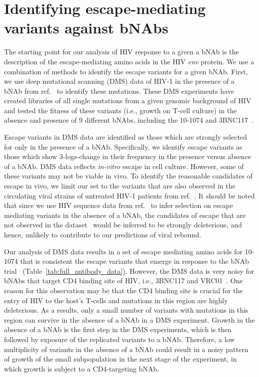 \documentclass[11pt]{article}
\begin{document}
\section{Identifying escape-mediating variants against bNAbs}
The starting point for our analysis of HIV response to a given a bNAb  is the description of the escape-mediating amino acids in the HIV {\em env} protein. We use a combination of methods to identify the escape variants for a given bNAb. First, we use deep mutational scanning (DMS) data  of HIV-1 in the presence of a bNAb from ref.~\cite{Dingens:2019fd} to identify these mutations. 
These DMS experiments  have created libraries of all single mutations from a given genomic background of HIV and tested the fitness of these variants (i.e., growth on T-cell culture)  in the absence and presence of 9 different bNAbs, including the 10-1074 and 3BNC117~\cite{Dingens:2019fd}.

Escape variants in DMS data are identified as those which are strongly selected for only in the presence of a bNAb. Specifically, we identify escape variants as those which show  3-logs-change in their frequency in the presence  versus  absence of  a bNAb. DMS data reflects {\em in-vitro} escape in cell culture. However, some of these variants may not be viable { in vivo}. To identify the reasonable candidates of escape {in vivo}, we limit our set to the variants  that are also observed  in  the circulating viral strains of untreated HIV-1 patients from ref.~\cite{Zanini:2015gg}. It should be noted that since we use HIV sequence data from ref.~\cite{Zanini:2015gg} to  infer selection on escape mediating variants in the absence of a bNAb, the candidates of escape that are not observed in the dataset~\cite{Zanini:2015gg}  would be inferred to be strongly deleterious, and hence, unlikely to contribute to our predictions of viral rebound.   

Our analysis of DMS data results in  a set of escape mediating amino acids for 10-1074 that is consistent the escape variants that emerge in response to the bNAb trial~\cite{Caskey:2017el} (Table~\ref{tab:full_antibody_data}). However, the DMS data is very noisy for bNAbs that target CD4 binding site of HIV, i.e.,  3BNC117 and VRC01~\cite{Dingens:2019fd}. 
One reason for this observation may be  that  the CD4 binding site is crucial for the entry of HIV  to the host's T-cells and mutations in this region are highly deleterious. As a results,  only a small number of variants with mutations in this region can survive in the absence of a bNAb in a DMS experiment. Growth in the absence of a bNAb is the first step in the DMS experiments, which is then followed by exposure of the replicated variants to a bNAb. Therefore, a low multiplicity of variants in the absence of a bNAb could  result in a noisy pattern of growth of the small subpopulation in the next stage of the experiment, in which growth is subject to a CD4-targeting bNAb.
\end{document}
